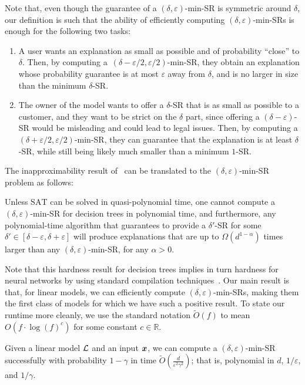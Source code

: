 Note that, even though the guarantee of a $(\delta, \varepsilon)$-min-SR is symmetric around $\delta$, our definition is such that the ability of efficiently computing $(\delta, \varepsilon)$-min-SRs is enough for the following two tasks:
\begin{enumerate}
    \item A user wants an explanation as small as possible and of probability ``close'' to $\delta$. Then, by computing a~$(\delta-\varepsilon/2, \varepsilon/2)$-min-SR, they obtain an explanation whose probability guarantee is at most $\varepsilon$ away from $\delta$, and is no larger in size than the minimum $\delta$-SR.
    \item The owner of the model wants to offer a $\delta$-SR that is as small as possible to a customer, and they want to be strict on the $\delta$ part, since offering a $(\delta - \varepsilon)$-SR would be misleading and could lead to legal issues. Then, by computing a $(\delta+\varepsilon/2, \varepsilon/2)$-min-SR, they can guarantee that the explanation is at least $\delta$-SR, while still being likely much smaller than a minimum $1$-SR. 
\end{enumerate}

The inapproximability result of~\citet{Kozachinskiy_2023} can be translated to the $(\delta, \varepsilon)$-min-SR problem as follows:
\begin{theorem}
    Unless $\mathrm{SAT}$ can be solved in quasi-polynomial time, one cannot compute a $(\delta, \varepsilon)$-min-SR for decision trees in polynomial time, and furthermore, any polynomial-time algorithm that guarantees to provide a $\delta'$-SR for some $\delta' \in [\delta-\varepsilon, \delta+\varepsilon]$ will produce explanations that are up to $\Omega(d^{1-\alpha})$ times larger than any $(\delta, \varepsilon)$-min-SR, for any $\alpha > 0$.
\end{theorem}
Note that this hardness result for decision trees implies in turn hardness for neural networks by using standard compilation techniques~\citep{NEURIPS2020_b1adda14}.
Our main result is that, for linear models, we can efficiently compute $(\delta, \varepsilon)$-min-SRs, making them the first class of models for which we have such a positive result. To state our runtime more cleanly, we use the standard notation $\widetilde{O}(f)$ to mean $O(f \cdot \log(f)^c)$ for some constant $c \in \mathbb{R}$. 
\begin{theorem}
    \label{prop:smoothed-explanation}
    Given a linear model $\mathcal{L}$ and an input ${\bm{x}}$, we can compute a $(\delta, \varepsilon)$-min-SR successfully with probability $1 - \gamma$ in time $\widetilde{O}\left( \frac{d}{\varepsilon^2\gamma^2}\right)$; that is, polynomial in $d$, $1/\varepsilon$, and $1/\gamma$.
\end{theorem}



